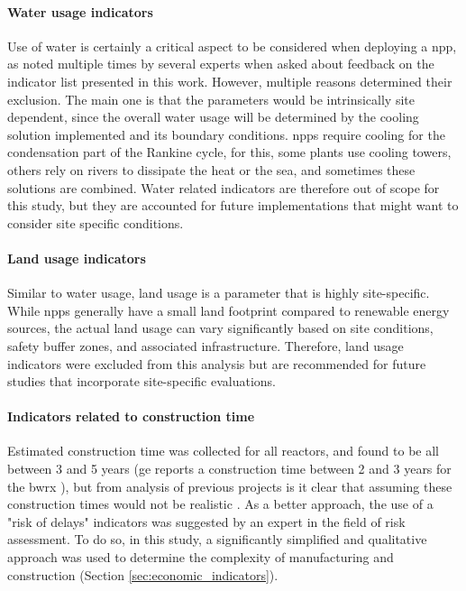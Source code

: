 \paragraph{Water usage indicators}
Use of water is certainly a critical aspect to be considered when deploying a \gls{npp}, as noted multiple times by several experts when asked about feedback on the indicator list presented in this work. However, multiple reasons determined their exclusion. The main one is that the parameters would be intrinsically site dependent, since the overall water usage will be determined by the cooling solution implemented and its boundary conditions. \glspl{npp} require cooling for the condensation part of the Rankine cycle, for this, some plants use cooling towers, others rely on rivers to dissipate the heat or the sea, and sometimes these solutions are combined. Water related indicators are therefore out of scope for this study, but they are accounted for future implementations that might want to consider site specific conditions. 

\paragraph{Land usage indicators}
Similar to water usage, land usage is a parameter that is highly site-specific. While \glspl{npp} generally have a small land footprint compared to renewable energy sources, the actual land usage can vary significantly based on site conditions, safety buffer zones, and associated infrastructure. Therefore, land usage indicators were excluded from this analysis but are recommended for future studies that incorporate site-specific evaluations.

\paragraph{Indicators related to construction time}
Estimated construction time was collected for all reactors, and found to be all between 3 and 5 years (\gls{ge} reports a construction time between 2 and 3 years for the \gls{bwrx} \cite{GEVernova_Nuclear_2025}), but from analysis of previous projects is it clear that assuming these construction times would not be realistic \cite{nea2020unlocking}.  As a better approach, the use of a "risk of delays" indicators was suggested by an expert in the field of risk assessment. To do so, in this study, a significantly simplified and qualitative approach was used to determine the complexity of manufacturing and construction (Section \ref{sec:economic_indicators}).

